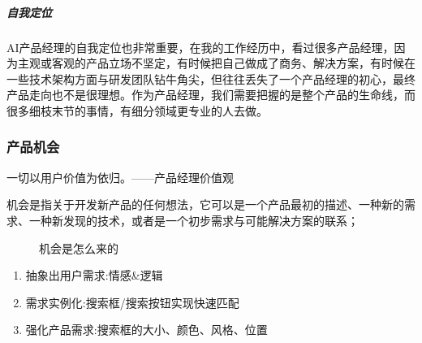 \documentclass[letterpaper,11pt,english]{sphinxmanual}
\begin{document}
\subparagraph{自我定位}
\label{\detokenize{chapter_introduction/ability:id18}}
AI产品经理的自我定位也非常重要，在我的工作经历中，看过很多产品经理，因为主观或客观的产品立场不坚定，有时候把自己做成了商务、解决方案，有时候在一些技术架构方面与研发团队钻牛角尖，但往往丢失了一个产品经理的初心，最终产品走向也不是很理想。作为产品经理，我们需要把握的是整个产品的生命线，而很多细枝末节的事情，有细分领域更专业的人去做。


\subsubsection{产品机会}
\label{\detokenize{chapter_introduction/opportunity:id1}}\label{\detokenize{chapter_introduction/opportunity::doc}}
一切以用户价值为依归。——产品经理价值观

机会是指关于开发新产品的任何想法，它可以是一个产品最初的描述、一种新的需求、一种新发现的技术，或者是一个初步需求与可能解决方案的联系；

\begin{figure}[H]
\centering
\capstart

\noindent{}
\caption{机会是怎么来的}\label{\detokenize{chapter_introduction/opportunity:id11}}\end{figure}
\begin{enumerate}
%
\item {} 
抽象出用户需求:情感\&逻辑

\item {} 
需求实例化:搜索框/搜索按钮实现快速匹配

\item {} 
强化产品需求:搜索框的大小、颜色、风格、位置%
\begin{footnote}[300]\sphinxAtStartFootnote
{}
%
\end{footnote}

\end{enumerate}
\end{document}
